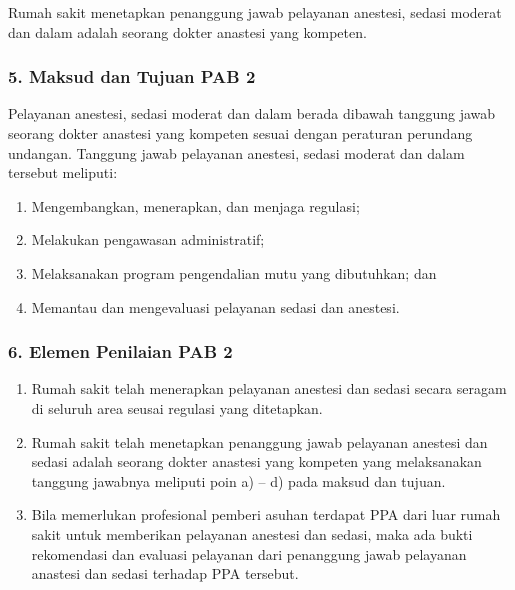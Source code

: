 \documentclass[
]{book}
\providecommand{\tightlist}{%
  \setlength{\itemsep}{0pt}\setlength{\parskip}{0pt}}
\begin{document}
Rumah sakit menetapkan penanggung jawab pelayanan anestesi, sedasi moderat dan dalam adalah seorang dokter anastesi yang kompeten.

\hypertarget{maksud-dan-tujuan-pab-2}{%
\subsubsection*{5. Maksud dan Tujuan PAB 2}\label{maksud-dan-tujuan-pab-2}}

Pelayanan anestesi, sedasi moderat dan dalam berada dibawah tanggung jawab seorang dokter anastesi yang kompeten sesuai dengan peraturan perundang undangan. Tanggung jawab pelayanan anestesi, sedasi moderat dan dalam tersebut meliputi:

\begin{enumerate}
\def\labelenumi{\alph{enumi}.}
\tightlist
\item
  Mengembangkan, menerapkan, dan menjaga regulasi;
\item
  Melakukan pengawasan administratif;
\item
  Melaksanakan program pengendalian mutu yang dibutuhkan; dan
\item
  Memantau dan mengevaluasi pelayanan sedasi dan anestesi.
\end{enumerate}

\hypertarget{elemen-penilaian-pab-2}{%
\subsubsection*{6. Elemen Penilaian PAB 2}\label{elemen-penilaian-pab-2}}

\begin{enumerate}
\def\labelenumi{\alph{enumi}.}
\tightlist
\item
  Rumah sakit telah menerapkan pelayanan anestesi dan sedasi secara seragam di seluruh area seusai regulasi yang ditetapkan.
\item
  Rumah sakit telah menetapkan penanggung jawab pelayanan anestesi dan sedasi adalah seorang dokter anastesi yang kompeten yang melaksanakan tanggung jawabnya meliputi poin a) -- d) pada maksud dan tujuan.
\item
  Bila memerlukan profesional pemberi asuhan terdapat PPA dari luar rumah sakit untuk memberikan pelayanan anestesi dan sedasi, maka ada bukti rekomendasi dan evaluasi pelayanan dari penanggung jawab pelayanan anastesi dan sedasi terhadap PPA tersebut.
\end{enumerate}
\end{document}
